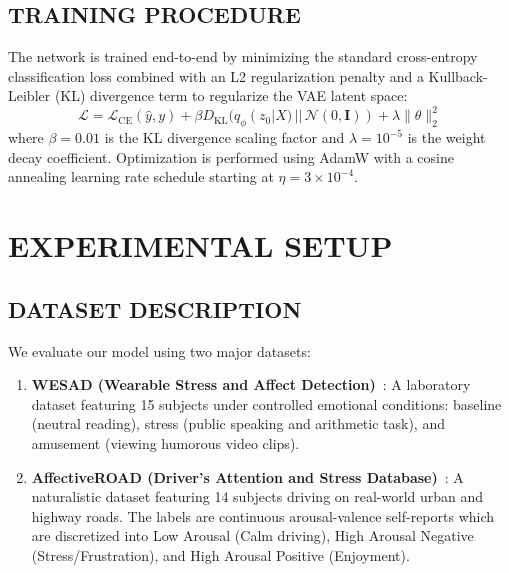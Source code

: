 \documentclass[12pt, a4paper]{report}
\numberwithin{equation}{chapter}
\begin{document}
\section{TRAINING PROCEDURE}
The network is trained end-to-end by minimizing the standard cross-entropy classification loss combined with an L2 regularization penalty and a Kullback-Leibler (KL) divergence term to regularize the VAE latent space:
\begin{equation}
\mathcal{L} = \mathcal{L}_{\text{CE}}(\hat{y}, y) + \beta D_{\text{KL}}(q_\phi(z_0 | X) \,||\, \mathcal{N}(0, \mathbf{I})) + \lambda \|\theta\|_2^2
\end{equation}
where $\beta = 0.01$ is the KL divergence scaling factor and $\lambda = 10^{-5}$ is the weight decay coefficient. Optimization is performed using AdamW with a cosine annealing learning rate schedule starting at $\eta = 3 \times 10^{-4}$.

\chapter{EXPERIMENTAL SETUP}

\section{DATASET DESCRIPTION}
We evaluate our model using two major datasets:
\begin{enumerate}
    \setlength{\itemsep}{2pt}
    \setlength{\parskip}{0pt}
    \setlength{\parsep}{0pt}
    \item \textbf{WESAD (Wearable Stress and Affect Detection)}~\cite{schmidt2018wesad}: A laboratory dataset featuring 15 subjects under controlled emotional conditions: baseline (neutral reading), stress (public speaking and arithmetic task), and amusement (viewing humorous video clips).
    \item \textbf{AffectiveROAD (Driver's Attention and Stress Database)}~\cite{ElHaouij2018}: A naturalistic dataset featuring 14 subjects driving on real-world urban and highway roads. The labels are continuous arousal-valence self-reports which are discretized into Low Arousal (Calm driving), High Arousal Negative (Stress/Frustration), and High Arousal Positive (Enjoyment).
\end{enumerate}
\end{document}

